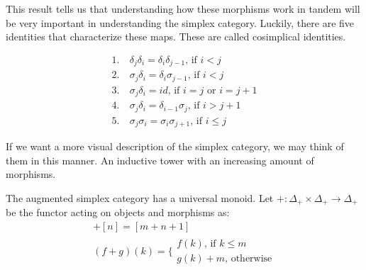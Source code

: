 \documentclass[../thesis.tex]{subfiles}
\begin{document}
        This result tells us that understanding how these morphisms work in tandem will be very important in understanding the simplex category. Luckily, there are five identities that characterize these maps. These are called cosimplical identities.

        \begin{align*}
            1.&\ \delta_j\delta_i = \delta_i\delta_{j-1} \text{, if }i<j \\
            2.&\ \sigma_j\delta_i = \delta_i\sigma_{j-1} \text{, if }i<j \\
            3.&\ \sigma_j\delta_i = id \text{, if }i=j\text{ or }i=j+1 \\
            4.&\ \sigma_j\delta_i = \delta_{i-1}\sigma_j \text{, if }i>j+1 \\
            5.&\ \sigma_j\sigma_i = \sigma_i\sigma_{j+1} \text{, if }i\leq j
        \end{align*}
        
        If we want a more visual description of the simplex category, we may think of them in this manner. An inductive tower with an increasing amount of morphisms. 
        \begin{center}

        \end{center}

        The augmented simplex category has a universal monoid. Let $+:\Delta_+ \times \Delta_+ \rightarrow \Delta_+$ be the functor acting on objects and morphisms as:
        \begin{align*}
            [m]+[n] = [m+n+1] \\
            (f+g)(k) = \biggl\{\substack{f(k)\text{, if }k\leq m \\ g(k)+m\text{, otherwise}}
        \end{align*}
\end{document}
